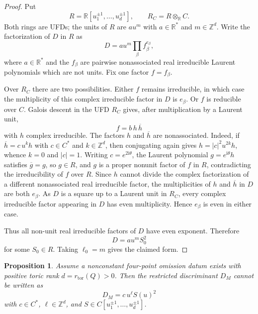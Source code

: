 \documentclass[11pt]{amsart}
\def\CC{C}%
\numberwithin{equation}{section}
\newtheorem{proposition}[theorem]{Proposition}
\theoremstyle{definition}
\theoremstyle{remark}
\newcommand{\CC}{\mathbb C}
\newcommand{\RR}{\mathbb R}
\newcommand{\ZZ}{\mathbb Z}
\newcommand{\rtor}{r_{\mathrm{tor}}}
\begin{document}
\begin{proof}
Put
\[
R=\RR[u_1^{\pm1},\dots,u_d^{\pm1}],\qquad
R_{\CC}=R\otimes_{\RR}\CC.
\]
Both rings are UFDs; the units of $R$ are $a u^m$ with $a\in\RR^*$ and $m\in\ZZ^d$.  Write the factorization of $D$ in $R$ as
\[
D=a u^m\prod_{\beta} f_\beta^{e_\beta},
\]
where $a\in\RR^*$ and the $f_\beta$ are pairwise nonassociated real irreducible Laurent polynomials which are not units.  Fix one factor $f=f_\beta$.

Over $R_{\CC}$ there are two possibilities.  Either $f$ remains irreducible, in which case the multiplicity of this complex irreducible factor in $D$ is $e_\beta$.  Or $f$ is reducible over $\CC$.  Galois descent in the UFD $R_{\CC}$ gives, after multiplication by a Laurent unit,
\[
f=b\,h\,\overline h
\]
with $h$ complex irreducible.  The factors $h$ and $\overline h$ are nonassociated.  Indeed, if $\overline h=c\,u^k h$ with $c\in\CC^*$ and $k\in\ZZ^d$, then conjugating again gives $h=|c|^2u^{2k}h$, whence $k=0$ and $|c|=1$.  Writing $c=e^{2\mathrm i\theta}$, the Laurent polynomial $g=e^{\mathrm i\theta}h$ satisfies $\overline g=g$, so $g\in R$, and $g$ is a proper nonunit factor of $f$ in $R$, contradicting the irreducibility of $f$ over $R$.  Since $h$ cannot divide the complex factorization of a different nonassociated real irreducible factor, the multiplicities of $h$ and $\overline h$ in $D$ are both $e_\beta$.  As $D$ is a square up to a Laurent unit in $R_{\CC}$, every complex irreducible factor appearing in $D$ has even multiplicity.  Hence $e_\beta$ is even in either case.

Thus all non-unit real irreducible factors of $D$ have even exponent.  Therefore
\[
D=a u^m S_0^2
\]
for some $S_0\in R$.  Taking $\ell_0=m$ gives the claimed form.
\end{proof}

\begin{proposition}\label{prop:DM-not-square}
Assume a nonconstant four-point omission datum exists with positive toric rank $d=\rtor(Q)>0$. Then the restricted discriminant $D_M$ cannot be written as
\[
D_M=c\,u^\ell S(u)^2
\]
with $c\in\CC^*$, $\ell\in\ZZ^d$, and $S\in\CC[u_1^{\pm1},\dots,u_d^{\pm1}]$.
\end{proposition}
\end{document}
